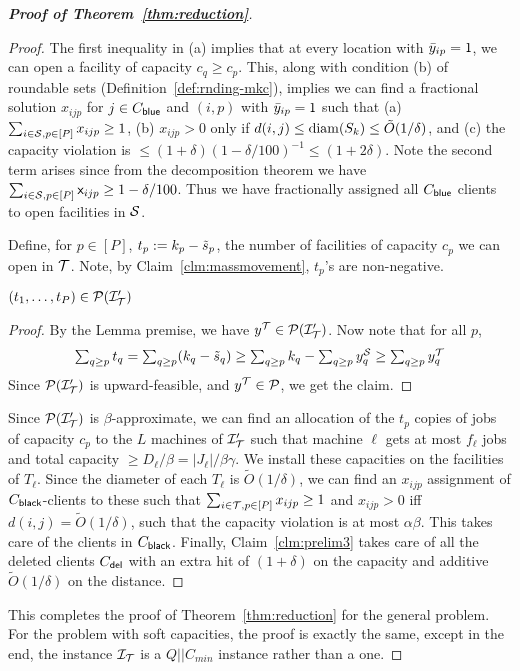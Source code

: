 \begin{proof}[{\bf Proof of Theorem~\ref{thm:reduction}}]
\begin{proof}
The first inequality in (a) implies that at every location with $\bar{y}_{ip} = 1$, we can open a facility of capacity $c_q \geq c_p$. This, along with condition (b) of roundable sets (Definition~\ref{def:rnding-mkc}),
implies we can find a fractional solution $x_{ijp}$ for $j\in C_{\mathsf{blue}}$ and $(i,p)$ with $\bar{y}_{ip} = 1$
such that (a) $\sum_{i\in {\cal S}, p\in [P]} x_{ijp} \geq 1$, (b) $x_{ijp} > 0$ only if $d(i,j) \leq \mathrm{diam}(S_k) \leq \tilde{O}(1/\delta)$, and (c) the capacity violation is $\leq (1+\delta)(1 - \delta/100)^{-1} \leq (1+2\delta)$. Note the second term arises since
from the decomposition theorem we have $\sum_{i\in {\cal S}, p\in [P]} {\mathsf x}_{ijp} \geq 1-\delta/100$.
Thus we have fractionally assigned all $C_{\mathsf{blue}}$ clients to open facilities in ${\cal S}$.


Define, for $p\in [P]$,  $t_p := k_p - \tilde{s}_p$, the number of facilities of capacity $c_p$ we can open in ${\cal T}$. Note, by Claim~\ref{clm:massmovement}, $t_p$'s are non-negative.
%
%
\begin{claim}
	$(t_1,\ldots,t_P) \in {\cal P}({\cal I}'_{\cal T})$
\end{claim}
\begin{proof}
	By the Lemma premise, we have $y^{\cal T} \in {\cal P}({\cal I}'_{\cal T})$. %
	Now note that for all $p$, 
	\[
\textstyle 	\sum_{q\geq p} t_q = \sum_{q\ge p} (k_q - \tilde{s}_q) \ge \sum_{q\ge p} k_q - \sum_{q\geq p} y^{\cal S}_q \geq  \sum_{q\geq p} y^{\cal T}_q 
	\]
	Since ${\cal P}({\cal I}'_{\cal T})$ is upward-feasible, and $y^{\cal T}\in {\cal P}$, we get the claim.
\end{proof}
Since ${\cal P}({\cal I}'_{\cal T})$ is $\beta$-approximate, we can find an allocation of the $t_p$ copies of jobs of capacity $c_p$ to the $L$ machines of ${\cal I}'_{\cal T}$ such that machine $\ell$ gets at most $f_\ell$ jobs and total capacity $\geq D_\ell/\beta = |J_\ell|/\beta\gamma$. We install these capacities on the facilities of $T_\ell$. Since the diameter of each $T_\ell$ is $\tilde{O}(1/\delta)$, we can find an $x_{ijp}$ assignment of $C_{\mathsf{black}}$-clients  to these such that $\sum_{i\in {\cal T},p\in [P]} x_{ijp} \geq 1$ and $x_{ijp} > 0$ iff $d(i,j) = \tilde{O}(1/\delta)$, such that the capacity violation is at most $\alpha\beta$. This takes care of the clients in $C_{\mathsf{black}}$. Finally, Claim~\ref{clm:prelim3} takes care of all the deleted clients $C_{\mathsf{del}}$ with an extra hit of $(1+\delta)$ on the capacity and additive $\tilde{O}(1/\delta)$ on the distance.
\end{proof}
\noindent
This completes the proof of Theorem~\ref{thm:reduction} for the general \mckc problem. For the problem with soft capacities, the proof is exactly the same, except in the end, the instance ${\cal I}_{\cal T}$ is a $Q||C_{min}$ instance rather than a \cckp one.
\end{proof}

